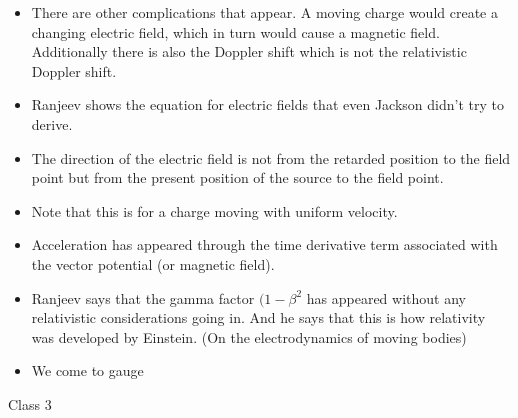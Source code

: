 \documentclass{../template/texnote}
\begin{document}
\begin{itemize}
\item
  There are other complications that appear. A moving charge would
  create a changing electric field, which in turn would cause a magnetic
  field. Additionally there is also the Doppler shift which is not the
  relativistic Doppler shift.
\item
  Ranjeev shows the equation for electric fields that even Jackson
  didn't try to derive.
\item
  The direction of the electric field is not from the retarded position
  to the field point but from the present position of the source to the
  field point.
\item
  Note that this is for a charge moving with uniform velocity.
\item
  Acceleration has appeared through the time derivative term associated
  with the vector potential (or magnetic field).
\item
  Ranjeev says that the gamma factor $(1-\beta^{2}$ has appeared without
  any relativistic considerations going in. And he says that this is how
  relativity was developed by Einstein. (On the electrodynamics of
  moving bodies)
\item
  We come to gauge
\end{itemize}

Class 3
\end{document}

